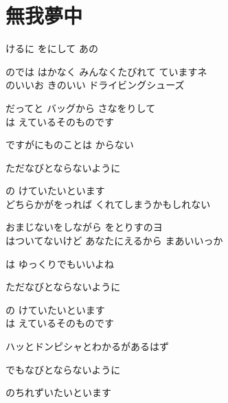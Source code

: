 \section{ 無我夢中}
\large{

けるに をにして あの

のでは はかなく みんなくたびれて ていますネ
\\

のいいお きのいい ドライビングシューズ

だってと バッグから さなをりして
\\

は えているそのものです

ですがにものことは からない

ただなびとならないように

 の けていたいといます
\\

どちらかがをっれば くれてしまうかもしれない

おまじないをしながら をとりすのヨ
\\

はついてないけど あなたにえるから まあいいっか

は ゆっくりでもいいよね

ただなびとならないように

 の けていたいといます
\\

は えているそのものです

ハッとドンピシャとわかるがあるはず

でもなびとならないように

 のちれずいたいといます

}